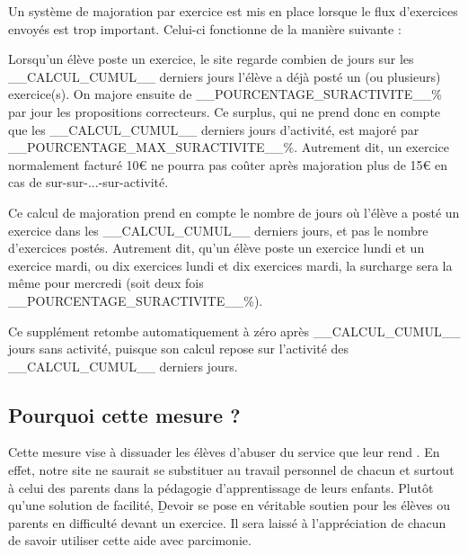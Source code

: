 ﻿Un système de majoration par exercice est mis en place lorsque le flux d'exercices envoyés est trop important. Celui-ci fonctionne de la manière suivante :
\item Lorsqu'un élève poste un exercice, le site regarde combien de jours sur les __CALCUL_CUMUL__ derniers jours l'élève a déjà posté un (ou plusieurs) exercice(s). On majore ensuite de __POURCENTAGE_SURACTIVITE__\% par jour les propositions correcteurs. Ce surplus, qui ne prend donc en compte que les __CALCUL_CUMUL__ derniers jours d'activité, est majoré par __POURCENTAGE_MAX_SURACTIVITE__\%. Autrement dit, un exercice normalement facturé 10€ ne pourra pas coûter après majoration plus de 15€ en cas de sur-sur-...-sur-activité.
\item Ce calcul de majoration prend en compte le nombre de jours où l'élève a posté un exercice dans les __CALCUL_CUMUL__ derniers jours, et pas le nombre d'exercices postés. Autrement dit, qu'un élève poste un exercice lundi et un exercice mardi, ou dix exercices lundi et dix exercices mardi, la surcharge sera la même pour mercredi (soit deux fois __POURCENTAGE_SURACTIVITE__\%).
\item Ce supplément retombe automatiquement à zéro après __CALCUL_CUMUL__ jours sans activité, puisque son calcul repose sur l'activité des __CALCUL_CUMUL__ derniers jours.

\subsection{Pourquoi cette mesure ?}

Cette mesure vise à dissuader les élèves d'abuser du service que leur rend \eDevoir. En effet, notre site ne saurait se substituer au travail personnel de chacun et surtout à celui des parents dans la pédagogie d'apprentissage de leurs enfants. Plutôt qu'une solution de facilité, \b{Devoir} se pose en véritable soutien pour les élèves ou parents en difficulté devant un exercice.
Il sera laissé à l'appréciation de chacun de savoir utiliser cette aide avec parcimonie.